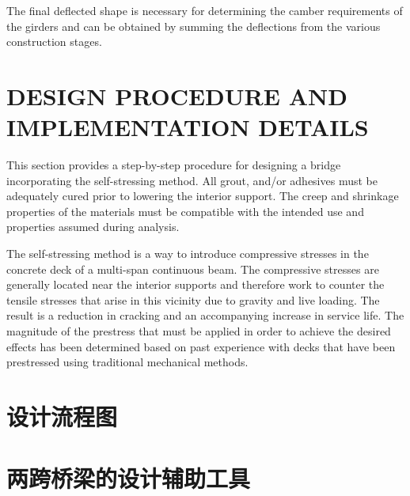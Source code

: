 The final deflected shape is necessary for determining the camber requirements of the girders and can be obtained by summing the deflections from the various construction stages.

\section{DESIGN PROCEDURE AND IMPLEMENTATION DETAILS}

This section provides a step-by-step procedure for designing a bridge incorporating the self-stressing method. All grout, and/or adhesives must be adequately cured prior to lowering the interior support. The creep and shrinkage properties of the materials must be compatible with the intended use and properties assumed during analysis.

The self-stressing method is a way to introduce compressive stresses in the concrete deck of a multi-span
continuous beam. The compressive stresses are generally located near the interior supports and therefore work to
counter the tensile stresses that arise in this vicinity due to gravity and live loading. The result is a reduction in
cracking and an accompanying increase in service life. The magnitude of the prestress that must be applied in order
to achieve the desired effects has been determined based on past experience with decks that have been prestressed
using traditional mechanical methods.




\section{设计流程图}

\section{两跨桥梁的设计辅助工具}
